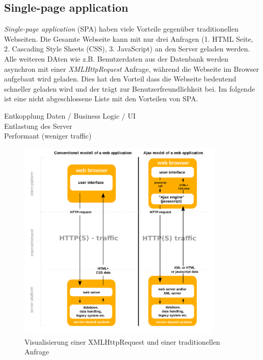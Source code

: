 \subsection{Single-page application}
\textit{Single-page application} (SPA) haben viele Vorteile gegenüber traditionellen Webseiten. Die Gesamte Webseite kann mit nur drei Anfragen (1. HTML Seite, 2. Cascading Style Sheets (CSS), 3. JavaScript) an den Server geladen werden. Alle weiteren DAten wie z.B. Benutzerdaten aus der Datenbank werden asynchron mit einer \textit{XMLHttpRequest} Anfrage, während die Webseite im Browser aufgebaut wird geladen. Dies hat den Vorteil dass die Webseite bedeutend schneller geladen wird und der trägt zur Benutzerfreundlichkeit bei. Im folgende ist eine nicht abgeschlossene Liste mit den Vorteilen von SPA.
\begin{description}
	\item[Entkopplung Daten / Business Logic / UI]
	\item[Entlastung des Server]
	\item[Performant (weniger traffic)]
\end{description}

\begin{figure}[ht]
	\centering
  \includegraphics[width=0.88\textwidth]{images/ajax.png}
	\caption{Visualisierung einer XMLHttpRequest und einer traditionellen Anfrage}
	\label{fig:ajax}
\end{figure}



